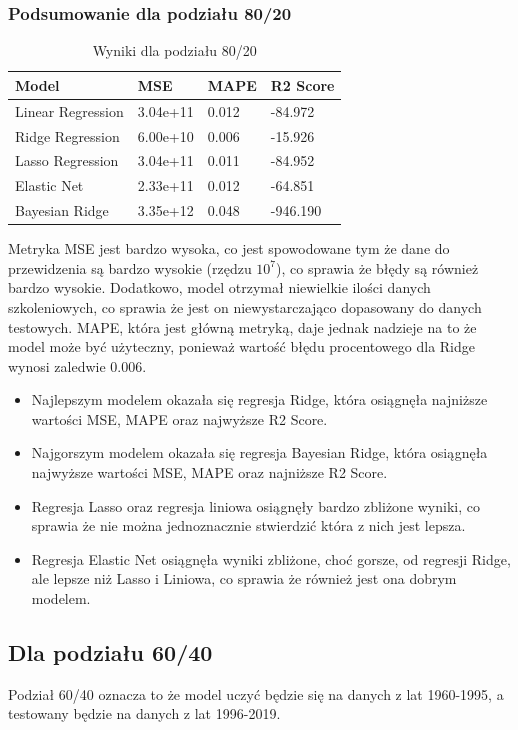 \documentclass[11pt]{article}
\begin{document}
\subsubsection*{Podsumowanie dla podziału 80/20}
\begin{table}[H]
        \centering
        \begin{tabular}{|l|l|l|l|}
        \hline
        Model & MSE & MAPE & R2 Score \\ \hline
        Linear Regression & 3.04e+11 & 0.012 & -84.972 \\ \hline
        Ridge Regression & 6.00e+10 & 0.006 & -15.926 \\ \hline
        Lasso Regression & 3.04e+11 & 0.011 & -84.952 \\ \hline
        Elastic Net & 2.33e+11 & 0.012 & -64.851 \\ \hline
        Bayesian Ridge & 3.35e+12 & 0.048 & -946.190 \\ \hline
        \end{tabular}
        \caption{Wyniki dla podziału 80/20}
\end{table}
Metryka MSE jest bardzo wysoka, co jest spowodowane tym że dane do przewidzenia są bardzo wysokie (rzędzu $10^7$), co sprawia że błędy są również bardzo wysokie.
Dodatkowo, model otrzymał niewielkie ilości danych szkoleniowych, co sprawia że jest on niewystarczająco dopasowany do danych testowych.
MAPE, która jest główną metryką, daje jednak nadzieje na to że model może być użyteczny, ponieważ wartość błędu procentowego dla Ridge wynosi zaledwie 0.006.
\begin{itemize}
        \item Najlepszym modelem okazała się regresja Ridge, która osiągnęła najniższe wartości MSE, MAPE oraz najwyższe R2 Score.
        \item Najgorszym modelem okazała się regresja Bayesian Ridge, która osiągnęła najwyższe wartości MSE, MAPE oraz najniższe R2 Score.
        \item Regresja Lasso oraz regresja liniowa osiągnęły bardzo zbliżone wyniki, co sprawia że nie można jednoznacznie stwierdzić która z nich jest lepsza.
        \item Regresja Elastic Net osiągnęła wyniki zbliżone, choć gorsze, od regresji Ridge, ale lepsze niż Lasso i Liniowa, co sprawia że również jest ona dobrym modelem.
\end{itemize}
\subsection*{Dla podziału 60/40}
Podział 60/40 oznacza to że model uczyć będzie się na danych z lat 1960-1995, a testowany będzie na danych z lat 1996-2019.
\end{document}
